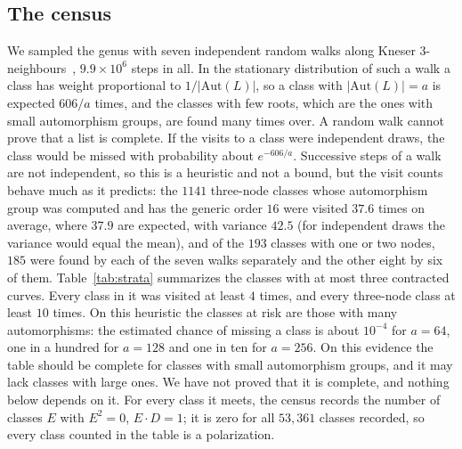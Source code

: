 \documentclass[11pt]{article}
\theoremstyle{remark}
\begin{document}
\subsection*{The census}
We sampled the genus with seven independent random walks along Kneser $3$-neighbours~\cite{Voight}, $9.9\times10^6$ steps
in all.  In the stationary distribution of such a walk a class has weight proportional to $1/|\mathrm{Aut}(L)|$, so a class with
$|\mathrm{Aut}(L)|=a$ is expected $606/a$ times, and the classes with few roots, which are the ones with small automorphism groups,
are found many times over.  A random walk cannot prove that a list is complete.  If the visits to a class were independent draws,
the class would be missed with probability about $e^{-606/a}$.  Successive steps of a walk are not independent, so this is a
heuristic and not a bound, but the visit counts behave much as it predicts: the $1141$ three-node classes whose automorphism group
was computed and has the generic order $16$ were visited $37.6$ times on average, where $37.9$ are expected, with variance $42.5$
(for independent draws the variance would equal the mean), and of the $193$ classes with one or two nodes, $185$ were found by each
of the seven walks separately and the other eight by six of them.  Table~\ref{tab:strata} summarizes the classes with at most three
contracted curves.  Every class in it was visited at least $4$ times, and every three-node class at least $10$ times.  On this
heuristic the classes at risk are those with many automorphisms: the estimated chance of missing a class is about $10^{-4}$ for
$a=64$, one in a hundred for $a=128$ and one in ten for $a=256$.  On this evidence the table should be complete for classes with small
automorphism groups, and it may lack classes with large ones.  We have not proved that it is complete, and nothing below depends
on it.  For every class it meets, the census records the
number of classes $E$ with $E^2=0$, $E\cdot D=1$; it is zero for all $53{,}361$ classes recorded, so every class counted in
the table is a polarization.
\end{document}
